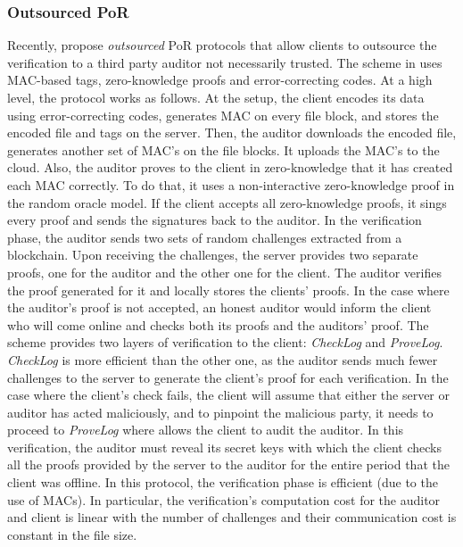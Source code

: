 \subsubsection {Outsourced PoR}\label{Outsourced-PoS}

Recently,  \cite{armknecht2014outsourced,xu2016lightweight} propose \emph{outsourced} PoR protocols that allow  clients to outsource the   verification to a third party auditor not necessarily  trusted. The scheme in \cite{armknecht2014outsourced} uses MAC-based tags, zero-knowledge proofs and error-correcting codes. At a high level, the protocol works as follows. At the setup,   the client  encodes its data using error-correcting codes, generates MAC on every file block, and stores the encoded file and tags on the server.  Then, the auditor downloads the encoded file, generates another set of MAC's on the file blocks. It uploads the MAC's to the cloud. Also, the auditor proves to the client in zero-knowledge that it has created each MAC correctly. To do that, it uses a non-interactive zero-knowledge proof in the random oracle model. If the client accepts all zero-knowledge proofs, it sings every proof and sends the signatures back to the auditor. In the verification phase, the auditor sends two sets of random challenges extracted from a blockchain. Upon receiving the challenges, the server provides two separate proofs, one for the auditor and the other one for the client. The auditor verifies the proof generated for it and  locally stores the clients' proofs. In the case where the auditor's proof is not accepted, an honest auditor would inform the client who will come online and checks both its proofs and the auditors' proof. The scheme provides two layers of verification to the client: \textit{CheckLog} and \textit{ProveLog}.  \textit{CheckLog}  is more efficient than the other one, as the auditor sends  much fewer challenges to the server to generate the client's proof for each verification. In the case where the client's check fails, the client will assume that either the server or auditor has acted maliciously, and to pinpoint the malicious party, it needs to proceed to \textit{ProveLog} where allows the client to audit the auditor. In this verification, the auditor must reveal its secret keys with which the client checks all the proofs provided by the server to the auditor for the entire period that the client was offline. In this protocol, the verification phase is efficient (due to the use of MACs). In particular, the verification's computation cost for the auditor and client is linear with the number of challenges and their communication cost is constant in the file size.  

